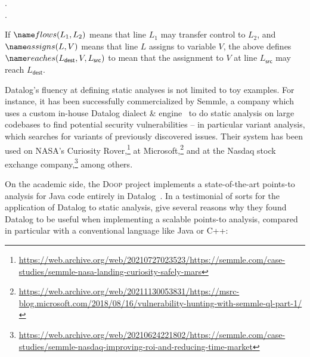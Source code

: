 \begin{datalog}
   \gets {}.
  \\
  \gets
  \neg{}
  \conj
  \conj
  .
\end{datalog}

\noindent
If $\atom{flows}{L_1, L_2}$ means that line $L_1$ may transfer control to $L_2$,
and $\atom{assigns}{L, V}$ means that line $L$ assigns to variable $V$, the
above defines $\atom{reaches}{L_{\textsf{dest}}, V, L_{\textsf{src}}}$
to mean that the assignment to $V$ at line $L_{\textsf{src}}$ may reach
$L_{\textsf{dest}}$. 

Datalog's fluency at defining static analyses is not limited to toy examples.
%
For instance, it has been successfully commercialized by Semmle, a company which
uses a custom in-house Datalog dialect \& engine~\citep{DBLP:conf/ecoop/AvgustinovMJS16} to do static
analysis on large codebases to find potential security vulnerabilities -- in
particular variant analysis, which searches for variants of previously
discovered issues.
%
Their system has been used on NASA's Curiosity Rover,\footnote{\url{https://web.archive.org/web/20210727023523/https://semmle.com/case-studies/semmle-nasa-landing-curiosity-safely-mars}} at Microsoft,\footnote{\url{https://web.archive.org/web/20211130053831/https://msrc-blog.microsoft.com/2018/08/16/vulnerability-hunting-with-semmle-ql-part-1/}} and at the
Nasdaq stock exchange company,\footnote{\url{https://web.archive.org/web/20210624221802/https://semmle.com/case-studies/semmle-nasdaq-improving-roi-and-reducing-time-market}} among others.




On the academic side, the \textsc{Doop} project implements a state-of-the-art
points-to analysis for Java code entirely in
Datalog~\citep{DBLP:conf/oopsla/BravenboerS09}.
%
In a testimonial of sorts for the application of Datalog to static analysis,
\citet{DBLP:conf/datalog/SmaragdakisB10} give several reasons why they found
Datalog to be useful when implementing a scalable points-to analysis, compared
in particular with a conventional language like Java or C++:

